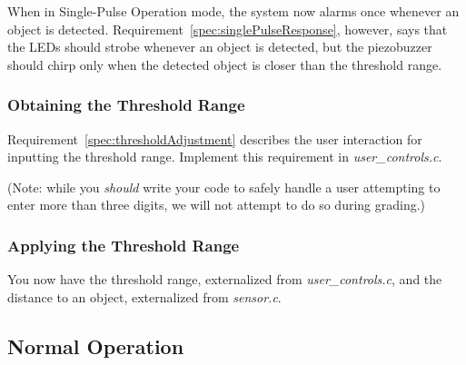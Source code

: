 When in Single-Pulse Operation mode, the system now alarms once whenever an object is detected.
Requirement~\ref{spec:singlePulseResponse}, however, says that the LEDs should strobe whenever an object is detected,
but the piezobuzzer should chirp only when the detected object is closer than the threshold range.
\begin{description}
\end{description}


\subsubsection{Obtaining the Threshold Range} \label{subsubsec:obtainingThreshold}

Requirement~\ref{spec:thresholdAdjustment} describes the user interaction for inputting the threshold range.
Implement this requirement in \textit{user\_controls.c}.

(Note: while you \textit{should} write your code to safely handle a user attempting to enter more than three digits, we will not attempt to do so during grading.)

\begin{description}
\end{description}


\subsubsection{Applying the Threshold Range} \label{subsubsec:applyingThreshold}

You now have the threshold range, externalized from \textit{user\_controls.c}, and the distance to an object, externalized from \textit{sensor.c}.

\begin{description}
\end{description}


\subsection{Normal Operation}


